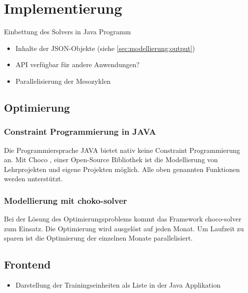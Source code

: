 \chapter{Implementierung}
\label{sec:implementierung} 
Einbettung des Solvers in Java Programm
\begin{itemize}
    \item Inhalte der JSON-Objekte (siehe \ref{sec:modellierung:output})
    \item API verfügbar für andere Anwendungen?
    \item Parallelisierung der Mesozyklen
\end{itemize}

\section{Optimierung}
\subsection{Constraint Programmierung in JAVA}
Die Programmiersprache JAVA\cite{java} bietet nativ keine Constraint Programmierung an. Mit Choco \cite{ChocoSolverWeb}, einer Open-Source Bibliothek ist die Modellierung von Lehrprojekten und eigene Projekten möglich. Alle oben genannten Funktionen werden unterstützt.
\subsection{Modellierung mit choko-solver}
Bei der Lösung des Optimierungsproblems kommt das Framework choco-solver zum Einsatz. Die Optimierung wird ausgelöst auf jeden Monat. Um Laufzeit zu sparen ist die Optimierung der einzelnen Monate parallelisiert.

\section{Frontend}

\begin{itemize}
    \item Darstellung der Trainingseinheiten als Liste in der Java Applikation
\end{itemize}

